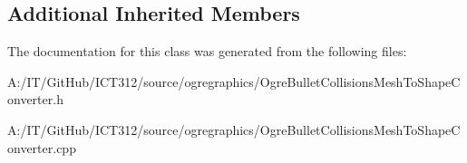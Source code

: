 \subsection*{Additional Inherited Members}


The documentation for this class was generated from the following files\-:\begin{DoxyCompactItemize}
\item 
A\-:/\-I\-T/\-Git\-Hub/\-I\-C\-T312/source/ogregraphics/Ogre\-Bullet\-Collisions\-Mesh\-To\-Shape\-Converter.\-h\item 
A\-:/\-I\-T/\-Git\-Hub/\-I\-C\-T312/source/ogregraphics/Ogre\-Bullet\-Collisions\-Mesh\-To\-Shape\-Converter.\-cpp\end{DoxyCompactItemize}

